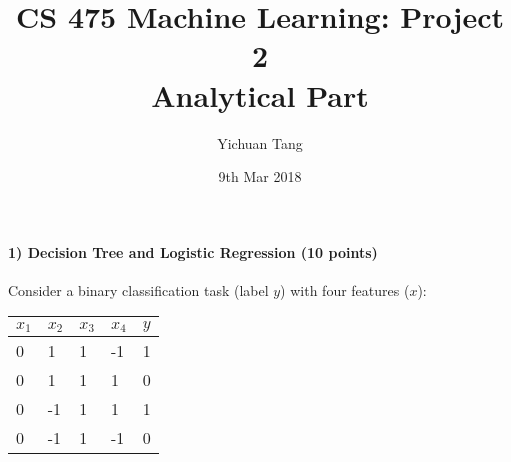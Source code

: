 \documentclass[11pt]{article}
\title{CS 475 Machine Learning: Project 2\\Analytical Part\\
}
\author{Yichuan Tang}
\date{9th Mar 2018}
\begin{document}
\large
\maketitle
\thispagestyle{headings}

\vspace{-.5in}

\paragraph{1) Decision Tree and Logistic Regression (10 points)}
Consider a binary classification task (label $y$) with four features ($x$):

\begin{tabular}{ |l|l|l|l|l| }
\hline
$x_1$ & $x_2$ & $x_3$ & $x_4$ & $y$ \\
\hline
 0& 1 & 1& -1 & 1 \\
 0&  1 & 1& 1 & 0 \\
 0&  -1 & 1& 1 & 1 \\
 0&  -1 & 1& -1 & 0 \\
\hline
\end{tabular}
\end{document}
